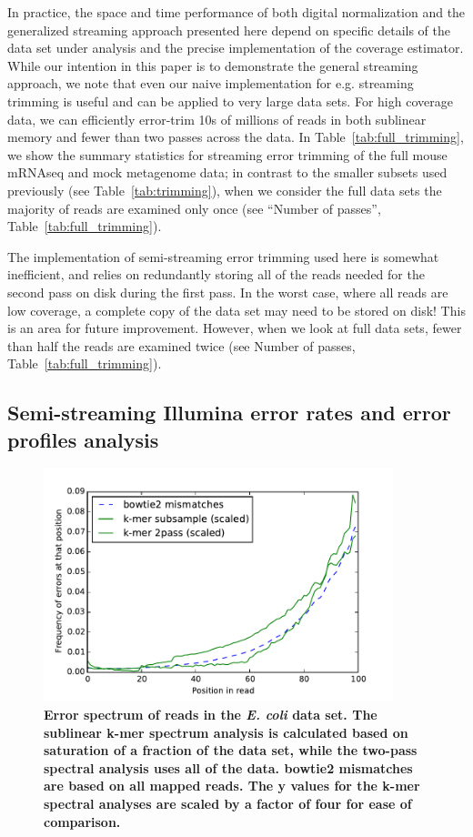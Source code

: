 In practice, the space and time performance of both digital normalization and
the generalized streaming approach presented here depend on specific details of
the data set under analysis and the precise implementation of the coverage
estimator. While our intention in this paper is to demonstrate the general
streaming approach, we note that even our naive implementation for e.g.
streaming trimming is useful and can be applied to very large data sets.  For
high coverage data, we can efficiently error-trim 10s of millions of reads in
both sublinear memory and fewer than two passes across the data.  In
Table~\ref{tab:full_trimming}, we show the summary statistics for streaming
error trimming of the full mouse mRNAseq and mock metagenome data; in contrast
to the smaller subsets used previously (see Table~\ref{tab:trimming}), when we
consider the full data sets the majority of reads are examined only once (see
``Number of passes'', Table~\ref{tab:full_trimming}).


The implementation of semi-streaming error trimming used here is
somewhat inefficient, and relies on redundantly storing all of the
reads needed for the second pass on disk during the first pass.  In
the worst case, where all reads are low coverage, a complete copy of
the data set may need to be stored on disk!  This is an area for
future improvement.  However, when we look at full data sets, fewer
than half the reads are examined twice (see Number of passes,
Table~\ref{tab:full_trimming}).




\subsection{Semi-streaming Illumina error rates and error profiles analysis}

\begin{figure}[!ht]
 \centerline{\includegraphics[width=4in]{./figures/ecoli-errhist}}
\caption{{\bf Error spectrum of reads in the {\em E. coli} data
    set. The sublinear k-mer spectrum analysis is calculated based on
    saturation of a fraction of the data set, while the two-pass
    spectral analysis uses all of the data.  bowtie2 mismatches are
    based on all mapped reads.  The y values for the k-mer spectral
    analyses are scaled by a factor of four for ease of comparison.}}
\label{fig:ecoli_err}
\end{figure}

